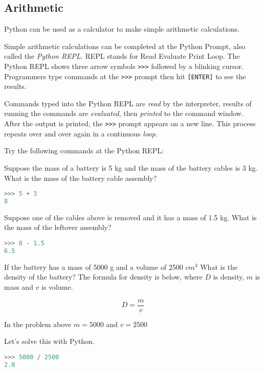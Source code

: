 \documentclass{book}
\newcommand{\passthrough}[1]{#1}
\begin{document}
    
        \hypertarget{arithmetic}{%
\subsection{Arithmetic}\label{arithmetic}}

Python can be used as a calculator to make simple arithmetic
calculations.

Simple arithmetic calculations can be completed at the Python Prompt,
also called the \emph{Python REPL}. REPL stands for Read Evaluate Print
Loop. The Python REPL shows three arrow symbols
\passthrough{\lstinline!>>>!} followed by a blinking cursor. Programmers
type commands at the \passthrough{\lstinline!>>>!} prompt then hit
\passthrough{\lstinline![ENTER]!} to see the results.

Commands typed into the Python REPL are \emph{read} by the interpreter,
results of running the commands are \emph{evaluated}, then
\emph{printed} to the command window. After the output is printed, the
\passthrough{\lstinline!>>>!} prompt appears on a new line. This process
repeats over and over again in a continuous \emph{loop}.

Try the following commands at the Python REPL:

Suppose the mass of a battery is 5 kg and the mass of the battery cables
is 3 kg. What is the mass of the battery cable assembly?

\begin{lstlisting}[language=Python]
>>> 5 + 3
8
\end{lstlisting}

Suppose one of the cables above is removed and it has a mass of 1.5 kg.
What is the mass of the leftover assembly?

\begin{lstlisting}[language=Python]
>>> 8 - 1.5
6.5
\end{lstlisting}

If the battery has a mass of 5000 g and a volume of 2500 \(cm^3\) What
is the density of the battery? The formula for density is below, where
\(D\) is density, \(m\) is mass and \(v\) is volume.

\[ D = \frac{m}{v} \]

In the problem above \(m = 5000\) and \(v=2500\)

Let's solve this with Python.

\begin{lstlisting}[language=Python]
>>> 5000 / 2500
2.0
\end{lstlisting}
\end{document}
